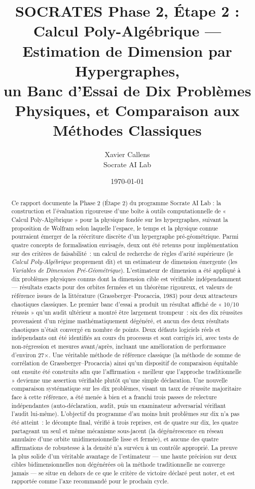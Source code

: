 \documentclass[11pt,a4paper]{article}
\title{\textbf{SOCRATES Phase 2, Étape 2 :} \\
\large Calcul Poly-Algébrique --- Estimation de Dimension par Hypergraphes, \\
un Banc d'Essai de Dix Problèmes Physiques, et Comparaison aux Méthodes Classiques}
\author{Xavier Callens \\ Socrate AI Lab}
\date{\today}
\begin{document}
\maketitle

\begin{abstract}
Ce rapport documente la Phase 2 (Étape 2) du programme Socrate AI Lab : la
construction et l'évaluation rigoureuse d'une boîte à outils computationnelle
de « Calcul Poly-Algébrique » pour la physique fondée sur les hypergraphes,
suivant la proposition de Wolfram selon laquelle l'espace, le temps et la
physique connue pourraient émerger de la réécriture discrète d'un
hypergraphe pré-géométrique. Parmi quatre concepts de formalisation
envisagés, deux ont été retenus pour implémentation sur des critères de
faisabilité~: un calcul de recherche de règles d'arité supérieure (le
\emph{Calcul Poly-Algébrique} proprement dit) et un estimateur de dimension
émergente (les \emph{Variables de Dimension Pré-Géométrique}). L'estimateur
de dimension a été appliqué à dix problèmes physiques connus dont la
dimension cible est vérifiable indépendamment --- résultats exacts pour des
orbites fermées et un théorème rigoureux, et valeurs de référence issues de
la littérature (Grassberger--Procaccia, 1983) pour deux attracteurs
chaotiques classiques. Le premier banc d'essai a produit un résultat
affiché de « 10/10 réussis » qu'un audit ultérieur a montré être largement
trompeur~: six des dix réussites provenaient d'un régime mathématiquement
dégénéré, et aucun des deux résultats chaotiques n'était convergé en nombre
de points. Deux défauts logiciels réels et indépendants ont été identifiés
au cours du processus et sont corrigés ici, avec tests de non-régression et
mesures avant/après, incluant une amélioration de performance d'environ
27$\times$. Une véritable méthode de référence classique (la méthode de
somme de corrélation de Grassberger--Procaccia) ainsi qu'un dispositif de
comparaison équitable ont ensuite été construits afin que l'affirmation
« meilleur que l'approche traditionnelle » devienne une assertion
vérifiable plutôt qu'une simple déclaration. Une nouvelle comparaison
systématique sur les dix problèmes, visant un taux de réussite majoritaire
face à cette référence, a été menée à bien et a franchi trois passes de
relecture indépendantes (auto-déclaration, audit, puis un examinateur
adversarial vérifiant l'audit lui-même). L'objectif du programme d'au
moins huit problèmes sur dix n'a pas été atteint~: le décompte final,
vérifié à trois reprises, est de quatre sur dix, les quatre partageant un
seul et même mécanisme sous-jacent (la dégénérescence en réseau annulaire
d'une orbite unidimensionnelle lisse et fermée), et aucune des quatre
affirmations de robustesse à la densité n'a survécu à un contrôle
approprié. La preuve la plus solide d'un véritable avantage de
l'estimateur --- une haute précision sur deux cibles bidimensionnelles non
dégénérées où la méthode traditionnelle ne converge jamais --- se situe en
dehors de ce que le critère de victoire déclaré peut noter, et est
rapportée comme l'axe recommandé pour le prochain cycle.
\end{abstract}
\end{document}

